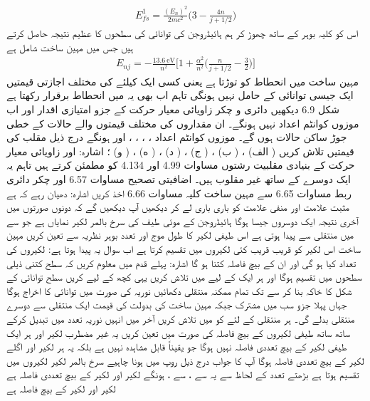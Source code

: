 \begin{align}
E_{fs}^1 = \frac{(E_n)^2}{2mc^2} \big ( 3 - \frac{4n}{j + 1/2} \big )
\end{align}
اس کو کلیہ بوہر کے ساتھ چھوڑ کر ہم ہائیڈروجن کی توانائی کی سطحوں کا عظیم نتیجہ حاصل کرتے ہیں جس میں مہین ساخت شامل ہے 
\begin{align}
E_{nj} = - \frac{\SI{13.6}{\electronvolt}}{n^2} \big [ 1 + \frac{\alpha^2}{n^2} \big ( \frac{n}{j + 1/2} - \frac{3}{2} \big ) \big ]
\end{align}
مہین ساخت  میں انحطاط کو توڑتا ہے یعنی کسی ایک  کیلئے  کی مختلف اجازتی قیمتیں ایک  جیسی توانائی کے حامل نہیں ہونگی تاہم اب بھی یہ  میں انحطاط  برقرار رکھتا ہے شکل 6.9  دیکھیں دائری و چکر زاویائی معیار حرکت  کے  جزو امتیازی اقدار  اور  اب موزوں کوانٹم اعداد نہیں ہونگے۔ ان مقداروں کی مختلف قیمتوں والے حالات کے خطی جوڑ ساکن حالات ہوں گے۔ ‏موزوں کوانٹم اعداد ، ، ، ، اور  ہونگے 
درج ذیل مقلب کی قیمتیں تلاش کریں
 ( الف) ، ( ب) ، ( ج) ، ( د) ، ( ه) ، ( و) ؛ اشارہ:  اور  زاویائی معیار حرکت کے بنیادی مقلبیت رشتوں مساوات 4.99 اور 4.134 کو مطمئن کرتے ہیں تاہم یہ ایک دوسرے کے ساتھ غیر مقلوب ہیں۔ 
اضافیتی تصحیح مساوات 6.57 اور چکر دائری ربط مساوات 6.65 سے مہین ساخت کلیہ مساوات 6.66 اخذ  کریں اشارہ: دھیان رہے کہ  ہے مثبت علامت اور منفی علامت کو باری باری لے کر دیکھیں آپ دیکھیں گے کہ دونوں صورتوں میں آخری نتیجہ ایک  دوسروں  جیسا ہوگا 
 ہائیڈروجن کے موئی   طیف  کی  سرخ  بالمر لکیر نمایاں ہے جو  سے  میں منتقلی سے پیدا ہوتی ہے اس طیفی  لکیر کا طول موج اور تعدد بوہر نظریہ سے تعین کریں مہین ساخت اس لکیر کو قریب قریب کئی لکیروں میں تقسیم کرتا ہے اب سوال یہ پیدا ہوتا ہے: لکیروں کی تعداد کیا ہو گی  اور ان  کے بیچ فاصلہ کتنا ہو گا اشارہ: پہلے قدم میں معلوم کریں کہ  سطح کتنی ذیلی سطحوں میں تقسیم ہوگا اور ہر ایک کے لیے  میں  تلاش کریں یہی کچھ  کے لیے کریں سطح توانائی کے شکل کا خاکہ بنا کر  سے  تک تمام   ممکنہ منتقلی دکھائیں نوریہ کی صورت میں توانائی کا اخراج     ہوگا جہاں پہلا جزو سب میں مشترک  جبکہ مہین ساخت کی      بدولت   کی قیمت  ایک منتقلی سے دوسرے منتقلی  بدلے گی۔        ہر منتقلی کے لئے  کو  میں تلاش         کریں آخر میں انہیں نوریہ تعدد میں تبدیل کرکے  ساتھ ساتھ طیفی لکیروں کے بیچ فاصلہ  کی صورت   میں تعین کریں یہ غیر مضطرب لکیر اور ہر ایک طیفی لکیر کے بیچ تعددی فاصلہ نہیں ہوگا جو یقیناً قابل مشاہدہ نہیں ہے بلکہ یہ ہر لکیر اور اگلے لکیر کے بیچ تعددی فاصلہ ہوگا آپ کا جواب درج ذیل روپ میں ہونا چاہیے  سرخ  بالمر لکیر  لکیروں میں تقسیم ہوتا ہے بڑھتے تعدد کے لحاظ سے یہ   سے ،   سے ،  ہونگے لکیر  اور لکیر  کے بیچ  تعددی فاصلہ   ہے لکیر  اور لکیر  کے بیچ فاصلہ   ہے  
